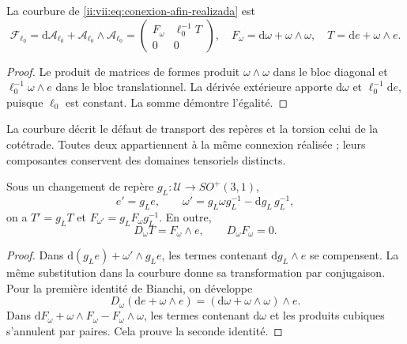\begin{proposition}
\label{ii:vii:prop:curvatura-afin}
La courbure de \eqref{ii:vii:eq:conexion-afin-realizada} est
\begin{equation}
 \mathcal F_{\ell_0}
 =\mathrm d\mathcal A_{\ell_0}
   +\mathcal A_{\ell_0}\wedge\mathcal A_{\ell_0}
 =\begin{pmatrix}F_\omega&\ell_0^{-1}T\\0&0\end{pmatrix},
 \quad F_\omega=\mathrm d\omega+\omega\wedge\omega,
 \quad T=\mathrm de+\omega\wedge e.
 \label{ii:vii:eq:curvatura-afin-realizada}
\end{equation}
\end{proposition}
\begin{proof}
Le produit de matrices de formes produit \(\omega\wedge\omega\) dans le bloc diagonal et \(\ell_0^{-1}\omega\wedge e\) dans le bloc translationnel. La dérivée extérieure apporte \(\mathrm d\omega\) et \(\ell_0^{-1}\mathrm de\), puisque \(\ell_0\) est constant. La somme démontre l'égalité.
\end{proof}

La courbure décrit le défaut de transport des repères et la torsion
celui de la cotétrade. Toutes deux appartiennent à la même connexion réalisée ;
leurs composantes conservent des domaines tensoriels distincts.

\begin{proposition}
\label{ii:vii:prop:bianchi-cartan}
Sous un changement de repère \(g_L:\mathcal U\to SO^+(3,1)\),
\[
 e'=g_Le,\qquad
 \omega'=g_L\omega g_L^{-1}-\mathrm dg_L\,g_L^{-1},
\]
on a \(T'=g_LT\) et \(F_{\omega'}=g_LF_\omega g_L^{-1}\). En outre,
\begin{equation}
 D_\omega T=F_\omega\wedge e,\qquad D_\omega F_\omega=0.
 \label{ii:vii:eq:bianchi-realizacion}
\end{equation}
\end{proposition}
\begin{proof}
Dans \(\mathrm d(g_Le)+\omega'\wedge g_Le\), les termes
contenant \(\mathrm dg_L\wedge e\) se compensent.
La même substitution dans la courbure donne sa transformation par
conjugaison. Pour la première identité de Bianchi, on développe
\[
 D_\omega(\mathrm de+\omega\wedge e)
 =(\mathrm d\omega+\omega\wedge\omega)\wedge e.
\]
Dans \(\mathrm dF_\omega+\omega\wedge F_\omega-F_\omega\wedge\omega\), les termes contenant \(\mathrm d\omega\) et les produits cubiques s'annulent par paires. Cela prouve la seconde identité.
\end{proof}

